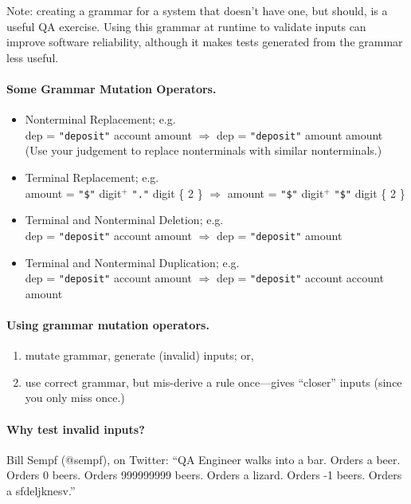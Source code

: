 \documentclass[11pt]{article}
\begin{document}
Note: creating a grammar for a system that doesn't have one, but should,
is a useful QA exercise. Using this grammar at runtime to validate inputs
can improve software reliability, although it makes tests generated
from the grammar less useful.


\paragraph{Some Grammar Mutation Operators.} 
\begin{itemize}
\item Nonterminal Replacement; e.g. \\
{\sf dep = {\tt "deposit"} account amount $\Longrightarrow$
 dep = {\tt "deposit"} amount amount}\\[4em]
(Use your judgement to replace nonterminals with similar nonterminals.)

\item Terminal Replacement; e.g. \\
{\sf amount = {\tt "\$"} digit$^+$ {\tt "."} digit \{ 2 \} 
$\Longrightarrow$ amount = {\tt "\$"} digit$^+$ {\tt "\$"} digit \{ 2 \} } \\[4em]

\item Terminal and Nonterminal Deletion; e.g.\\
{\sf dep = {\tt "deposit"} account amount $\Longrightarrow$
 dep = {\tt "deposit"} amount}\\[4em]

\item Terminal and Nonterminal Duplication; e.g.\\
{\sf dep = {\tt "deposit"} account amount $\Longrightarrow$
 dep = {\tt "deposit"} account account amount}\\[4em]
\end{itemize}

\paragraph{Using grammar mutation operators.}
\begin{enumerate}
\item mutate grammar, generate (invalid) inputs; or,
\item use correct grammar, but mis-derive a rule once---gives ``closer''
inputs (since you only miss once.)
\end{enumerate}

\paragraph{Why test invalid inputs?} Bill Sempf (@sempf), on Twitter: ``QA Engineer walks into a bar. Orders a beer. Orders 0 beers. Orders 999999999 beers. Orders a lizard. Orders -1 beers. Orders a sfdeljknesv.''
\end{document}
